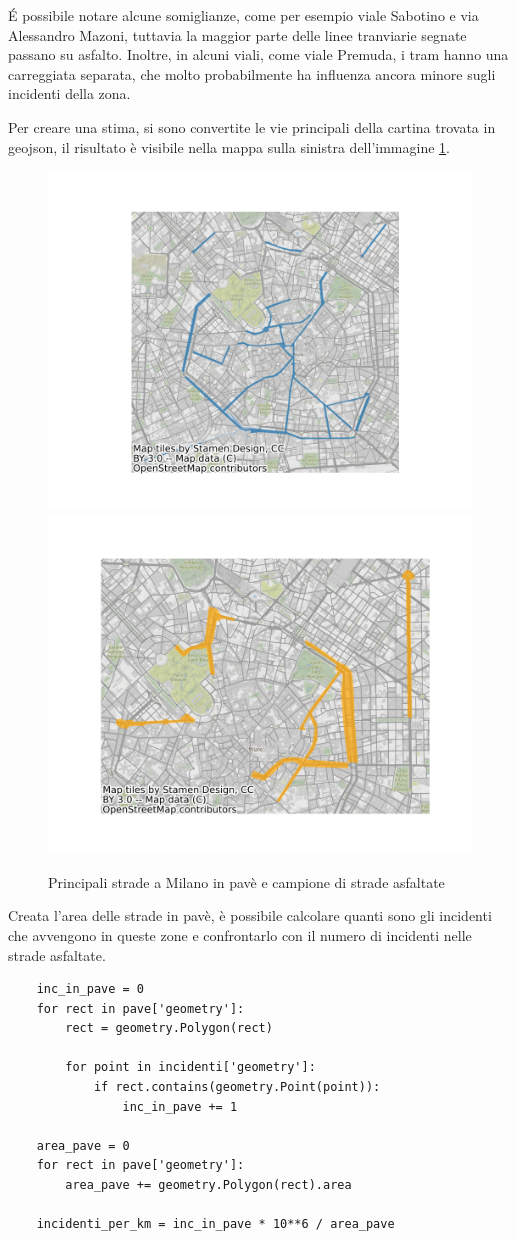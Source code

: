 \documentclass[a4paper]{report}
\begin{document}
\'E possibile notare alcune somiglianze, come per esempio viale Sabotino e via Alessandro Mazoni, 
tuttavia la maggior parte delle linee tranviarie segnate passano su asfalto.
Inoltre, in alcuni viali, come viale Premuda, i tram hanno una carreggiata separata, 
che molto probabilmente ha influenza ancora minore sugli incidenti della zona.

Per creare una stima, si sono convertite le vie principali della cartina trovata 
in geojson, il risultato è visibile nella mappa sulla sinistra 
dell'immagine \ref{fig:mappa-pave}.

\begin{figure}
    \includegraphics[width=0.5\linewidth]{../src/pave/mappa_pave.png}
    \includegraphics[width=0.5\linewidth]{../src/pave/mappa_asfalto.png}
    \caption{Principali strade a Milano in pavè e campione di strade asfaltate}
    \label{fig:mappa-pave}
\end{figure}

Creata l'area delle strade in pavè, è possibile calcolare quanti sono gli incidenti che 
avvengono in queste zone e confrontarlo con il numero di incidenti nelle strade asfaltate.

\begin{lstlisting}
    inc_in_pave = 0
    for rect in pave['geometry']: 
        rect = geometry.Polygon(rect)

        for point in incidenti['geometry']: 
            if rect.contains(geometry.Point(point)): 
                inc_in_pave += 1

    area_pave = 0
    for rect in pave['geometry']: 
        area_pave += geometry.Polygon(rect).area

    incidenti_per_km = inc_in_pave * 10**6 / area_pave
\end{lstlisting}
\end{document}
